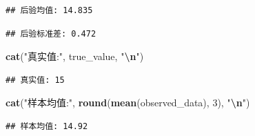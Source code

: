 \documentclass[
]{book}
\newenvironment{Shaded}{\begin{snugshade}}{\end{snugshade}}
\newcommand{\CommentTok}[1]{\textcolor[rgb]{0.56,0.35,0.01}{\textit{#1}}}
\newcommand{\DecValTok}[1]{\textcolor[rgb]{0.00,0.00,0.81}{#1}}
\newcommand{\FloatTok}[1]{\textcolor[rgb]{0.00,0.00,0.81}{#1}}
\newcommand{\FunctionTok}[1]{\textcolor[rgb]{0.13,0.29,0.53}{\textbf{#1}}}
\newcommand{\NormalTok}[1]{#1}
\newcommand{\OtherTok}[1]{\textcolor[rgb]{0.56,0.35,0.01}{#1}}
\newcommand{\SpecialCharTok}[1]{\textcolor[rgb]{0.81,0.36,0.00}{\textbf{#1}}}
\newcommand{\StringTok}[1]{\textcolor[rgb]{0.31,0.60,0.02}{#1}}
\begin{document}
\begin{verbatim}
## 后验均值: 14.835
\end{verbatim}

\begin{Shaded}
\end{Shaded}

\begin{verbatim}
## 后验标准差: 0.472
\end{verbatim}

\begin{Shaded}
\begin{Highlighting}[]
\FunctionTok{cat}\NormalTok{(}\StringTok{"真实值:"}\NormalTok{, true\_value, }\StringTok{"}\SpecialCharTok{\textbackslash{}n}\StringTok{"}\NormalTok{)}
\end{Highlighting}
\end{Shaded}

\begin{verbatim}
## 真实值: 15
\end{verbatim}

\begin{Shaded}
\begin{Highlighting}[]
\FunctionTok{cat}\NormalTok{(}\StringTok{"样本均值:"}\NormalTok{, }\FunctionTok{round}\NormalTok{(}\FunctionTok{mean}\NormalTok{(observed\_data), }\DecValTok{3}\NormalTok{), }\StringTok{"}\SpecialCharTok{\textbackslash{}n}\StringTok{"}\NormalTok{)}
\end{Highlighting}
\end{Shaded}

\begin{verbatim}
## 样本均值: 14.92
\end{verbatim}

\begin{Shaded}
\end{Shaded}
\end{document}
